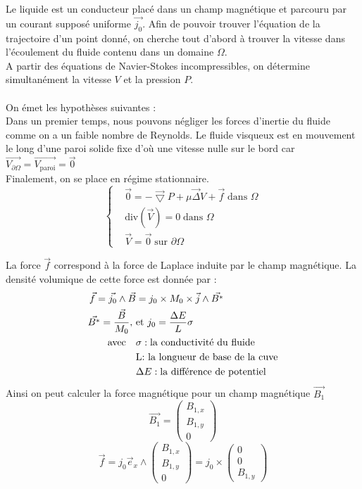 \documentclass[a4paper,12pt,titlepage]{report}
\begin{document}
\begin{onehalfspace}
Le liquide est un conducteur placé dans un champ magnétique et parcouru par un courant supposé uniforme $\vec{j_0}$.
\normalsize 
Afin de pouvoir trouver l'équation de la trajectoire d’un point donné, on cherche tout d’abord à trouver la vitesse dans l'écoulement du fluide contenu dans un domaine $\Omega$.
\\A partir des équations de Navier-Stokes incompressibles, on détermine simultanément la vitesse  $V$ et la pression $P$. 
\\
\\
On émet les hypothèses suivantes :
\\
Dans un premier temps, nous pouvons négliger les forces d’inertie du fluide comme on a un faible nombre de Reynolds.
Le fluide visqueux est en mouvement le long d’une paroi solide fixe d’où une vitesse nulle sur le bord car 
$\vec{V_{\partial\Omega}}=\vec{V_{\text{paroi}}}=\vec{0}$
\\	
Finalement, on se place en régime stationnaire.
\begin{equation*}
  \left\{
    \begin{aligned}
      &\vec{0}=-\vec{\bigtriangledown}P +\mu\vec{\Delta}V +\vec{f}\;\text{dans }\Omega \\
      &\text{div}(\vec{V})=0\;\text{dans }\Omega \\     
      &\vec{V}=\vec{0}\;\text{sur }\partial\Omega
    \end{aligned}
  \right.
\end{equation*}

La force $\vec{f}$ correspond à la force de Laplace induite par le champ magnétique. La densité volumique de cette force est donnée par :
\[
\begin{aligned}
	\vec{f}=\vec{j_0}\land\vec{B}&=j_0\times M_0\times \vec{j}\wedge \vec{B^*} \\
	 \vec{B^*} =\frac{\vec{B}}{M_0}, 
	\ &\text{et} \ j_0=\frac{\Delta E}{L}\sigma
	\\
\text{avec} \quad
&\sigma : \text{la conductivité du fluide }
\\%
&\text{L: la longueur de base de la cuve} \\
&\Delta E : \text{la différence de potentiel}
\end{aligned} \\
\]
Ainsi on peut calculer la force magnétique pour un champ magnétique $\vec{B_1}$
\[
	\vec{B_1} = 
	\begin{pmatrix}
   		B_{1,x}\\
  		 B _{1,y}\\
  		 0
	\end{pmatrix} 
\]
\[
	\vec{f}=j_0\vec{e}_{x}
	\wedge\begin{pmatrix}
   		B_{1,x}\\
   		B _{1,y}\\
   		0
\end{pmatrix}=
j_0\times \begin{pmatrix}
  			0\\
   			0\\
    		B_{1,y}
			\end{pmatrix} 
\]


\end{onehalfspace}
\end{document}
